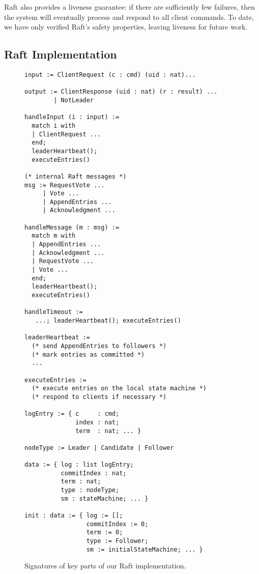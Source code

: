 Raft also provides a liveness guarantee:
if there are sufficiently few failures,
then the system will eventually process and respond to
all client commands.
To date, we have only verified Raft's safety properties,
leaving liveness for future work.

\subsection{Raft Implementation}\label{ssec:verdi:raft-impl}

\begin{figure}[ht!]
  \centering
  \small
\begin{lstlisting}[language=caml,basicstyle=\scriptsize\tt,morekeywords={output,send,nop}]
input := ClientRequest (c : cmd) (uid : nat)...

output := ClientResponse (uid : nat) (r : result) ...
        | NotLeader

handleInput (i : input) :=
  match i with
  | ClientRequest ...
  end;
  leaderHeartbeat();
  executeEntries()

(* internal Raft messages *)
msg := RequestVote ...
     | Vote ...
     | AppendEntries ...
     | Acknowledgment ...

handleMessage (m : msg) :=
  match m with
  | AppendEntries ...
  | Acknowledgment ...
  | RequestVote ...
  | Vote ...
  end;
  leaderHeartbeat();
  executeEntries()

handleTimeout :=
   ...; leaderHeartbeat(); executeEntries()

leaderHeartbeat :=
  (* send AppendEntries to followers *)
  (* mark entries as committed *)
  ...

executeEntries :=
  (* execute entries on the local state machine *)
  (* respond to clients if necessary *)

logEntry := { c     : cmd;
              index : nat;
              term  : nat; ... }

nodeType := Leader | Candidate | Follower

data := { log : list logEntry;
          commitIndex : nat;
          term : nat;
          type : nodeType;
          sm : stateMachine; ... }

init : data := { log := [];
                 commitIndex := 0;
                 term := 0;
                 type := Follower;
                 sm := initialStateMachine; ... }
\end{lstlisting}
  \caption{Signatures of key parts of our Raft implementation.}
\label{fig:raft-pseudocode}
\end{figure}

